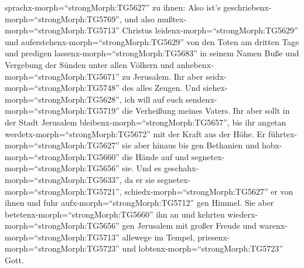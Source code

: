 sprachx-morph=``strongMorph:TG5627'' zu ihnen: Also ist's
geschriebenx-morph=``strongMorph:TG5769'', und also
mußtex-morph=``strongMorph:TG5713'' Christus
leidenx-morph=``strongMorph:TG5629'' und
auferstehenx-morph=``strongMorph:TG5629'' von den Toten am dritten Tage
 und predigen lassenx-morph=``strongMorph:TG5683'' in
seinem Namen Buße und Vergebung der Sünden unter allen Völkern und
anhebenx-morph=``strongMorph:TG5671'' zu Jerusalem.  Ihr
aber seidx-morph=``strongMorph:TG5748'' des alles Zeugen. 
Und siehex-morph=``strongMorph:TG5628'', ich will auf euch
sendenx-morph=``strongMorph:TG5719'' die Verheißung meines Vaters. Ihr
aber sollt in der Stadt Jerusalem bleibenx-morph=``strongMorph:TG5657'',
bis ihr angetan werdetx-morph=``strongMorph:TG5672'' mit der Kraft aus
der Höhe.  Er führtex-morph=``strongMorph:TG5627'' sie aber
hinaus bis gen Bethanien und hobx-morph=``strongMorph:TG5660'' die Hände
auf und segnetex-morph=``strongMorph:TG5656'' sie.  Und es
geschahx-morph=``strongMorph:TG5633'', da er sie
segnetex-morph=``strongMorph:TG5721'',
schiedx-morph=``strongMorph:TG5627'' er von ihnen und fuhr
aufx-morph=``strongMorph:TG5712'' gen Himmel.  Sie aber
betetenx-morph=``strongMorph:TG5660'' ihn an und kehrten
wiederx-morph=``strongMorph:TG5656'' gen Jerusalem mit großer Freude
 und warenx-morph=``strongMorph:TG5713'' allewege im
Tempel, priesenx-morph=``strongMorph:TG5723'' und
lobtenx-morph=``strongMorph:TG5723'' Gott.
